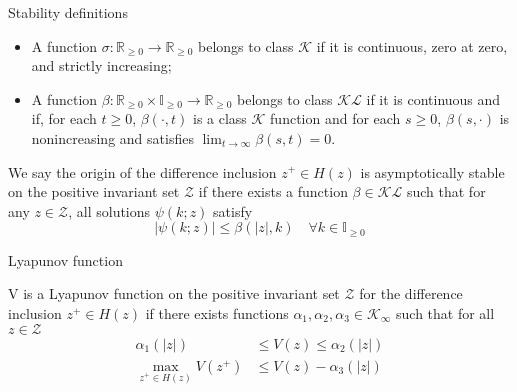 \documentclass{beamer}
\newcommand{\abs}[1]{\left\lvert #1 \right\rvert}
\newcommand{\bbR}{\mathbb{R}}
\newcommand{\bbI}{\mathbb{I}}
\newcommand{\mc}{\mathcal}
\begin{document}

\begin{frame}{Stability definitions}

\begin{definition}[]\mbox{}
\begin{itemize}
\item   A function $\sigma:\bbR_{\geq 0} \rightarrow \bbR_{\geq 0}$ belongs to
  class $\mc{K}$ if it is continuous, zero at zero, and strictly
  increasing; 
\item A function
  $\beta:\bbR_{\geq 0}\times \bbI_{\geq 0} \rightarrow \bbR_{\geq 0}$
  belongs to class $\mc{KL}$ if it is continuous and if, for each
  $t \ge 0$, $\beta(\cdot,t)$ is a class $\mc{K}$ function and for
  each $s\ge 0$, $\beta(s,\cdot)$ is nonincreasing and satisfies
  $\lim_{t \rightarrow \infty}\beta(s,t)=0$.  
\end{itemize}
\end{definition}

\begin{definition}
\label{def:as}
We say the origin of the difference inclusion $z^+ \in H(z)$ is 
asymptotically stable on the positive invariant set $\mathcal{Z}$ if there exists a function
$\beta \in \mathcal{KL}$ such that for any $z \in \mathcal{Z}$, all solutions
$\psi(k;z)$ satisfy
\begin{equation*}
\abs{\psi(k;z)} \leq \beta(\abs{z},k) \quad \forall k \in \mathbb{I}_{\geq 0}
\end{equation*}
\end{definition}
\end{frame}

\begin{frame}{Lyapunov function}
\begin{definition}
\label{def:lyap}
V is a Lyapunov function on the positive invariant set $\mathcal{Z}$ for the difference 
inclusion $z^+ \in H(z)$ if there exists functions $\alpha_1,\alpha_2,\alpha_3
\in \mathcal{K}_\infty$ such that for all $z \in \mathcal{Z}$
\begin{align*}
\alpha_1(\abs{z}) &\leq V(z) \leq \alpha_2(\abs{z}) \\
\max_{z^+ \in H(z)} V(z^+) &\leq V(z) - \alpha_3(\abs{z})
\end{align*}
\end{definition}
\end{frame}
\end{document}
